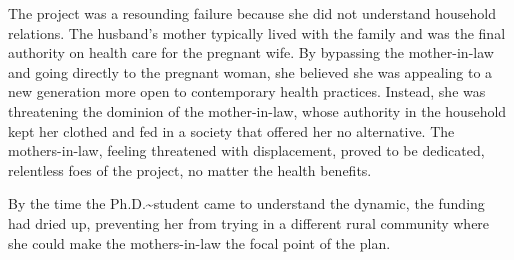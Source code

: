 The project was a resounding failure because she did not understand
household relations. The husband's mother typically lived with the
family and was the final authority on health care for the pregnant wife.
By bypassing the mother-in-law and going directly to the pregnant woman,
she believed she was appealing to a new generation more open to
contemporary health practices. Instead, she was threatening the dominion
of the mother-in-law, whose authority in the household kept her clothed
and fed in a society that offered her no alternative. The
mothers-in-law, feeling threatened with displacement, proved to be
dedicated, relentless foes of the project, no matter the health
benefits.

By the time the Ph.D.\textasciitilde student came to understand the
dynamic, the funding had dried up, preventing her from trying in a
different rural community where she could make the mothers-in-law the
focal point of the plan.


